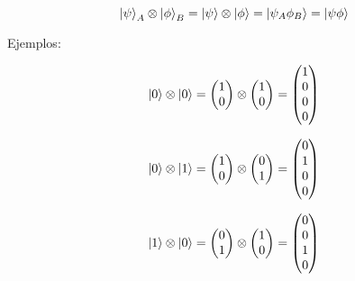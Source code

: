 
\begin{equation*}
    \ket{\psi}_A \otimes \ket{\phi}_B = \ket{\psi} \otimes \ket{\phi} = \ket{\psi_A \phi_B} = \ket{\psi\phi}
\end{equation*}

Ejemplos:

\begin{equation*}
    \ket{0} \otimes \ket{0}
    = \begin{pmatrix} 1\\0 \end{pmatrix} \otimes \begin{pmatrix} 1\\0 \end{pmatrix}
    = \begin{pmatrix} 1\\0\\0\\0 \end{pmatrix}
\end{equation*}

\begin{equation*}
    \ket{0} \otimes \ket{1}
    = \begin{pmatrix} 1\\0 \end{pmatrix} \otimes \begin{pmatrix} 0\\1 \end{pmatrix}
    = \begin{pmatrix} 0\\1\\0\\0 \end{pmatrix}
\end{equation*}

\begin{equation*}
    \ket{1} \otimes \ket{0}
    = \begin{pmatrix} 0\\1 \end{pmatrix} \otimes \begin{pmatrix} 1\\0 \end{pmatrix}
    = \begin{pmatrix} 0\\0\\1\\0 \end{pmatrix}
\end{equation*}

